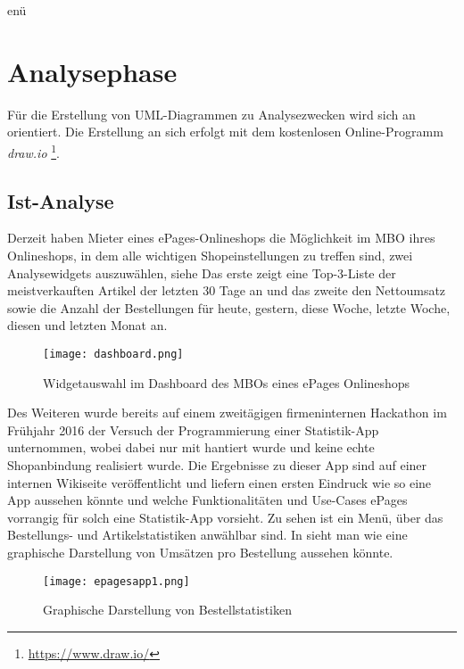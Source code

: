 enü%
\section{Analysephase} 
\label{sec:Analysephase}

Für die Erstellung von \acs{UML}-Diagrammen zu Analysezwecken wird sich an \cite{UML} orientiert. Die Erstellung an sich erfolgt mit dem kostenlosen Online-Programm \textit{draw.io} \footnote{\url{https://www.draw.io/}}.

\subsection{Ist-Analyse} 
\label{sec:IstAnalyse}
Derzeit haben Mieter eines ePages-Onlineshops die Möglichkeit im \acs{MBO} ihres Onlineshops, in dem alle wichtigen Shopeinstellungen zu treffen sind, zwei Analysewidgets auszuwählen, siehe  Das erste zeigt eine Top-3-Liste der meistverkauften Artikel der letzten 30 Tage an und das zweite den Nettoumsatz sowie die Anzahl der Bestellungen für heute, gestern, diese Woche, letzte Woche, diesen und letzten Monat an.
\begin{figure}[htb]
\begin{center}
\texttt{[image: dashboard.png]}
\caption{Widgetauswahl im Dashboard des \acs{MBO}s eines ePages Onlineshops}
\label{fig:dashboard}
\end{center}
\end{figure}
Des Weiteren wurde bereits auf einem zweitägigen firmeninternen Hackathon im Frühjahr 2016 der Versuch der Programmierung einer Statistik-App unternommen, wobei dabei nur mit   hantiert wurde und keine echte Shopanbindung realisiert wurde. Die Ergebnisse zu dieser App sind auf einer internen Wikiseite veröffentlicht und liefern einen ersten Eindruck wie so eine App aussehen könnte und welche Funktionalitäten und Use-Cases ePages vorrangig für solch eine Statistik-App vorsieht. Zu sehen ist ein Menü, über das Bestellungs- und Artikelstatistiken anwählbar sind. In  sieht man wie eine graphische Darstellung von Umsätzen pro Bestellung aussehen könnte.

\begin{figure}[htb]
\begin{center}
\texttt{[image: epagesapp1.png]}
\caption{Graphische Darstellung von Bestellstatistiken}
\label{fig:order}
\end{center}
\end{figure}

